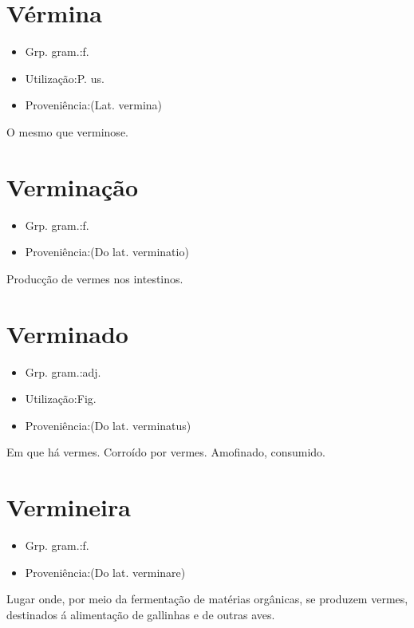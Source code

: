 \documentclass{article}
\begin{document}
\section{Vérmina}
\begin{itemize}
\item {Grp. gram.:f.}
\end{itemize}
\begin{itemize}
\item {Utilização:P. us.}
\end{itemize}
\begin{itemize}
\item {Proveniência:(Lat. \textunderscore vermina\textunderscore )}
\end{itemize}
O mesmo que \textunderscore verminose\textunderscore .
\section{Verminação}
\begin{itemize}
\item {Grp. gram.:f.}
\end{itemize}
\begin{itemize}
\item {Proveniência:(Do lat. \textunderscore verminatio\textunderscore )}
\end{itemize}
Producção de vermes nos intestinos.
\section{Verminado}
\begin{itemize}
\item {Grp. gram.:adj.}
\end{itemize}
\begin{itemize}
\item {Utilização:Fig.}
\end{itemize}
\begin{itemize}
\item {Proveniência:(Do lat. \textunderscore verminatus\textunderscore )}
\end{itemize}
Em que há vermes.
Corroído por vermes.
Amofinado, consumido.
\section{Vermineira}
\begin{itemize}
\item {Grp. gram.:f.}
\end{itemize}
\begin{itemize}
\item {Proveniência:(Do lat. \textunderscore verminare\textunderscore )}
\end{itemize}
Lugar onde, por meio da fermentação de matérias orgânicas, se produzem vermes, destinados á alimentação de gallinhas e de outras aves.
\end{document}
